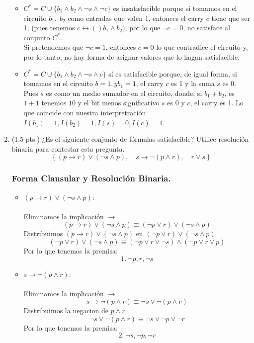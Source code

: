 \documentclass[12pt,letterpaper]{article}
\begin{document}
\begin{enumerate}
  \begin{itemize}
  \item $C^* = C \cup \{b_1 \land b_2 \land \neg s \land \neg c\}$ es insatisfacible porque si tomamos en el circuito $b_1,\; b_2$ como entradas que valen 1, entonces el carry $c$ tiene que ser 1, (pues tenemos $c \leftrightarrow ()b_1 \land b_2)$, por lo que $\neg c = 0$, no satisface al conjunto $C^*$.\\
    Si pretendemos que $\neg c = 1$, entonces $c = 0$ lo que contradice el circuito y, por lo tanto, no hay forma de asignar valores que lo hagan satisfacible.
  \item $C^* = C \cup \{b_1 \land b_2 \land \neg s \land c\}$ sí es satisfacible porque, de igual forma, si tomamos en el circuito $b = 1, y b_1 = 1$, el carry $c$ es 1 y la suma $s$ es 0. Pues $s$ es como un medio sumador en el circuito, donde, si $b_1 + b_2$, es $1+1$ tenemos $10$ y el bit menos significativo $s$ es 0 y $c$, el carry es 1. Lo que coincide con nuestra interpretraci\'{o}n $I(b_1) = 1, I(b_2) = 1, I(s) = 0, I(c) = 1$.
\end{itemize}
  
  \item (1.5 pts.) ¿Es el siguiente conjunto de fórmulas satisfacible? Utilice resolución binaria para contestar esta pregunta.
    \[
    \left \{ (p \rightarrow r) \lor (\neg s \land p),\quad s \rightarrow \neg (p \land r),\quad r \lor s \right \}
    \]
    \subsubsection*{Forma Clausular y Resoluci\'{o}n Binaria.}
    \begin{itemize}[label=\textbullet]
    \item $(p \rightarrow r) \lor (\neg s \land p)$:\\
      \\
      Eliminamos la implicaci\'{o}n $\rightarrow$
      \[
      (p \rightarrow r) \lor (\neg s \land p)
      \equiv
      (\neg p \lor r) \lor (\neg s \land p)
      \]
      Distribuimos $(p \rightarrow r) \lor (\neg s \land p)$ en $(\neg p \lor r) \lor (\neg s \land p)$
      \[
      (\neg p \lor r) \lor (\neg s \land p)
      \equiv
      (\neg p \lor r \lor \neg s) \land (\neg p \lor r \lor p)
      \]
      Por lo que tenemos la premisa:
      \[
      1.\: \neg p, r, \neg s
      \]
    \item $s \rightarrow \neg(p \land r)$:\\
      \\
      Eliminamos la implicaci\'{o}n $\rightarrow$
      \[
      s \rightarrow \neg(p \land r)
      \equiv
      \neg s \lor \neg (p \land r)
      \]
      Distribuimos la negacion de $p \land r$
      \[
      \neg s \lor \neg (p \land r)
      \equiv
      \neg s \lor \neg p \lor \neg r
      \]
      Por lo que tenemos la premisa:
      \[
      2.\: \neg s, \neg p, \neg r
      \]
    \end{itemize}


\end{enumerate}
\end{document}

